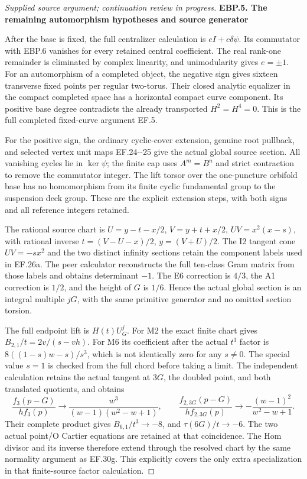 \begin{proof}[Supplied source argument; continuation review in progress]
\medskip\noindent\textbf{EBP.5. The remaining automorphism hypotheses and source generator}

\par\nobreak

After the base is fixed, the full centralizer calculation is
\(eI+c\delta\psi\). Its commutator with EBP.6 vanishes for every
retained central coefficient. The real rank-one remainder is eliminated
by complex linearity, and unimodularity gives \(e=\pm1\). For an
automorphism of a completed object, the negative sign gives sixteen
transverse fixed points per regular two-torus. Their closed analytic
equalizer in the compact completed space has a horizontal compact curve
component. Its positive base degree contradicts the already transported
\(H^2=H^4=0\). This is the full completed fixed-curve argument EF.5.

For the positive sign, the ordinary cyclic-cover extension, genuine
root pullback, and selected vertex unit maps EF.24-\/-25 give the actual
global source section. All vanishing cycles lie in \(\ker\psi\);
the finite cap uses \(A^m=B^n\) and strict contraction to remove
the commutator integer. The lift torsor over the one-puncture orbifold
base has no homomorphism from its finite cyclic fundamental group to
the suspension deck group. These are the explicit extension steps,
with both signs and all reference integers retained.

The rational source chart is
\(U=y-t-x/2\), \(V=y+t+x/2\), \(UV=x^2(x-s)\), with rational
inverse \(t=(V-U-x)/2\), \(y=(V+U)/2\). The I2 tangent cone
\(UV=-sx^2\) and the two distinct infinity sections retain the
component labels used in EF.26a. The peer calculator reconstructs the
full ten-class Gram matrix from those labels and obtains determinant
\(-1\). The E6 correction is \(4/3\), the A1 correction is
\(1/2\), and the height of \(G\) is \(1/6\). Hence the actual
global section is an integral multiple \(jG\), with the same
primitive generator and no omitted section torsion.

The full endpoint lift is \(H(t)U_G^j\). For M2 the exact finite chart
gives \(B_{2,1}/t=2v/(s-vh)\). For M6 its coefficient after the
actual \(t^3\) factor is \(8((1-s)w-s)/s^3\), which is not
identically zero for any \(s\ne0\). The special value \(s=1\)
is checked from the full chord before taking a limit. The independent
calculation retains the actual tangent at \(3G\), the doubled point,
and both translated quotients, and obtains
\[
 \frac{f_3(p-G)}{h f_3(p)}\longrightarrow
 \frac{w^3}{(w-1)(w^2-w+1)},\qquad
 \frac{f_{2,3G}(p-G)}{h f_{2,3G}(p)}\longrightarrow
 -\frac{(w-1)^2}{w^2-w+1}.
 \tag{EBP.16}
\]
Their complete product gives \(B_{6,1}/t^3\to-8\), and
\(\tau(6G)/t\to-6\). The two actual point/O Cartier equations
are retained at that coincidence. The Hom divisor and its inverse
therefore extend through the resolved chart by the same normality
argument as EF.30g. This explicitly covers the only extra specialization
in that finite-source factor calculation.


\end{proof}
